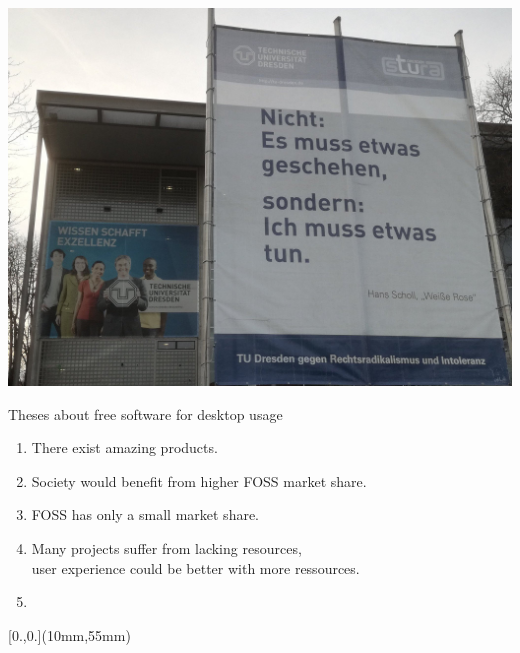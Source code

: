 \documentclass[t]{beamer}
\begin{document}


\begin{frame}[label=ct3,plain]{}

\vspace{1mm}
\begin{center}
\includegraphics[width=1.05\textwidth]{img-src/tud-ich-muss-etwas-tun}
\end{center}
\end{frame}

\newlength{\breite}


\begin{frame}[label=obs1]{Theses about free software for desktop usage}
\begin{enumerate}
\item There exist amazing products.
\pause
\medskip

\item Society would benefit from higher FOSS market share.
\pause
\medskip

\item FOSS has only a small market share.
\pause
\medskip

\item Many projects suffer from lacking resources,\\
user experience could be better with more ressources.
\pause
\bigskip
\bigskip

\item
\end{enumerate}


\begin{textblock*}{\textwidth}[0.,0.](10mm,55mm)
\setlength{\breite}{0.9\textwidth}

\end{textblock*}


\end{frame}
\end{document}
